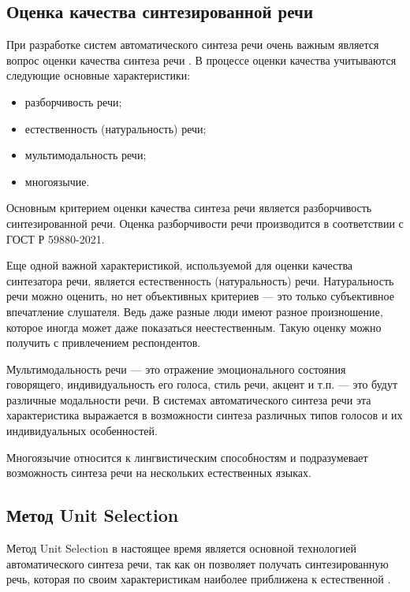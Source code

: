 \subsection{Оценка качества синтезированной речи}

При разработке систем автоматического синтеза речи очень важным является вопрос оценки качества синтеза речи \cite{quality}.
В процессе оценки качества учитываются следующие основные характеристики:
\begin{itemize}[label=---]
\item разборчивость речи;
\item естественность (натуральность) речи;
\item мультимодальность речи;
\item многоязычие.
\end{itemize}

Основным критерием оценки качества синтеза речи является разборчивость синтезированной речи. Оценка разборчивости речи производится в соответствии с ГОСТ Р 59880-2021.

Еще одной важной характеристикой, используемой для оценки качества синтезатора речи, является естественность (натуральность) речи. 
Натуральность речи можно оценить, но нет объективных критериев --- это только субъективное впечатление слушателя. 
Ведь даже разные люди имеют разное произношение, которое иногда может даже показаться неестественным. Такую оценку можно получить с привлечением респондентов.

Мультимодальность речи --- это отражение эмоционального состояния говорящего, индивидуальность его голоса, стиль речи, акцент и т.п. --- это будут различные модальности речи.
В системах автоматического синтеза речи эта характеристика выражается в возможности синтеза различных типов голосов и их индивидуальных особенностей. 

Многоязычие относится к лингвистическим способностям и подразумевает возможность синтеза речи на нескольких естественных языках. 

\subsection{Метод Unit Selection}

Метод Unit Selection в настоящее время является основной технологией автоматического синтеза речи, так как он позволяет получать синтезированную речь, которая по своим характеристикам наиболее приближена к естественной \cite{synthesis_book}.

